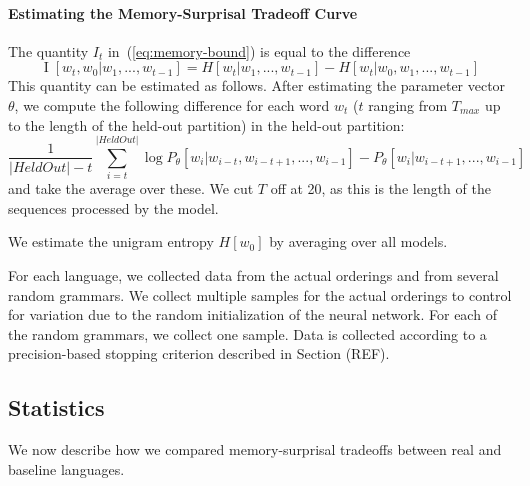 \paragraph{Estimating the Memory-Surprisal Tradeoff Curve}



The quantity $I_t$ in~(\ref{eq:memory-bound}) is equal to the difference 
\begin{equation}
\operatorname{I}[w_t, w_0 | w_1, ..., w_{t-1}] = H[w_t|w_1, ..., w_{t-1}] - H[w_t|w_0, w_1, ..., w_{t-1}]
\end{equation}
This quantity can be estimated as follows.
After estimating the parameter vector $\theta$, we compute the following difference for each word $w_t$ ($t$ ranging from $T_{max}$ up to the length of the held-out partition) in the held-out partition:
\begin{equation}
	\frac{1}{|HeldOut|-t} \sum_{i=t}^{|HeldOut|} \log P_\theta[w_i | w_{i-t}, w_{i-t+1}, ..., w_{i-1}] - P_\theta[w_i | w_{i-t+1}, ..., w_{i-1}]
\end{equation}
and take the average over these.
We cut $T$ off at 20, as this is the length of the sequences processed by the model.


We estimate the unigram entropy $H[w_0]$ by averaging over all models.

For each language, we collected data from the actual orderings and from several random grammars.
We collect multiple samples for the actual orderings to control for variation due to the random initialization of the neural network.
For each of the random grammars, we collect one sample.
Data is collected according to a precision-based stopping criterion described in Section (REF).

\subsection{Statistics}

We now describe how we compared memory-surprisal tradeoffs between real and baseline languages.


